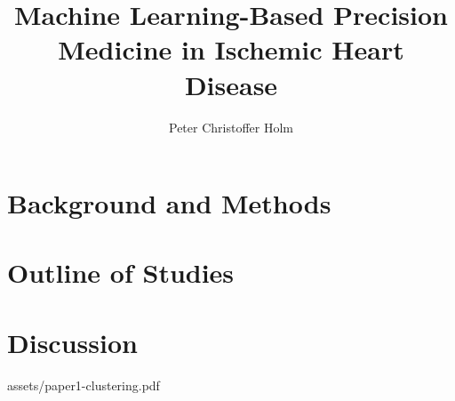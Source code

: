 \documentclass[a4paper, twoside, nobib]{tufte-book}
\title[ML-based precision medicine in ischemic heart disease]{%
    Machine Learning-Based Precision Medicine in Ischemic Heart Disease}
\author[Peter Christoffer Holm]{Peter Christoffer Holm}
\begin{document}
\frontmatter
\kutitlepage
\maketitlepage

  

        
        

\cleardoublepage

\tableofcontents
\listoffigures
\listoftables

      

\cleardoublepage
   

\mainmatter %

\part{Background and Methods}
       
   
  
    

\part{Outline of Studies}
 
 
 

\part{Discussion}
      


\backmatter %

\printbibliography

\mainmatter %

\appendix
\appendixpage
\addappheadtotoc
\cleardoublepage

%
    {assets/paper1-clustering.pdf}
\end{document}
